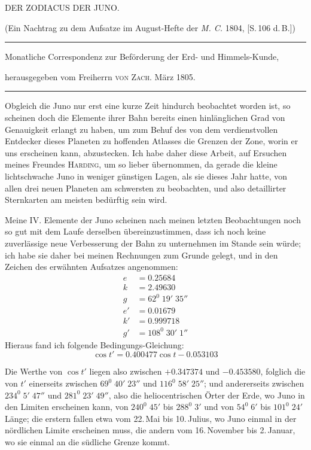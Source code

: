 \clearpage{}%
\begin{center}
{\small DER ZODIACUS DER JUNO.\par}
\medskip
{\small (Ein Nachtrag zu dem Aufsatze im August-Hefte der \textit{M. C.} 1804, [S.\,106 d.\,B.])\par}
\medskip\hrule\medskip
{\small Monatliche Correspondenz zur Beförderung der Erd- und Himmels-Kunde,\par
herausgegeben vom Freiherrn \textsc{von Zach}. März 1805.\par}
\medskip\hrule
\end{center}\medskip
Obgleich die Juno nur erst eine kurze Zeit hindurch beobachtet worden ist,
so scheinen doch die Elemente ihrer Bahn bereits einen hinlänglichen Grad
von Genauigkeit erlangt zu haben, um zum Behuf des von dem verdienstvollen
Entdecker dieses Planeten zu hoffenden Atlasses die Grenzen der Zone, worin er
uns erscheinen kann, abzustecken. Ich habe daher diese Arbeit, auf Ersuchen
meines Freundes \textsc{Harding}, um so lieber übernommen, da gerade die kleine
lichtschwache Juno in weniger günstigen Lagen, als sie dieses Jahr hatte, von
allen drei neuen Planeten am schwersten zu beobachten, und also detaillirter
Sternkarten am meisten bedürftig sein wird.

Meine IV. Elemente der Juno scheinen nach meinen letzten Beobachtungen
noch so gut mit dem Laufe derselben übereinzustimmen, dass ich noch keine
zuverlässige neue Verbesserung der Bahn zu unternehmen im Stande sein würde;
ich habe sie daher bei meinen Rechnungen zum Grunde gelegt, und in den
Zeichen des erwähnten Aufsatzes angenommen:
\[
\begin{aligned}
e&=0.25684\\
k&=2.49630\\
g&=62^0\;19'\;35''\\
e'&=0.01679\\
k'&=0.999718\\
g'&=108^0\;30'\;1''
\end{aligned}
\]
%
Hieraus fand ich folgende Bedingungs-Gleichung:
\[
\cos t'=0.400477\cos t-0.053103
\]

Die Werthe von $\cos t'$ liegen also zwischen $+0.347374$ und $-0.453580$,
folglich die von $t'$ einerseits zwischen $69^0\;40'\;23''$ und $116^0\;58'\;25''$; und
andererseits zwischen $234^0\;5'\;47''$ und $281^0\;23'\;49''$, also die heliocentrischen Örter
der Erde, wo Juno in den Limiten erscheinen kann, von $240^0\;45'$ bis $288^0\;3'$
und von $54^0\;6'$ bis $101^0\;24'$ Länge; die erstern fallen etwa vom 22.\,Mai bis 10.\,Julius,
wo Juno einmal in der nördlichen Limite erscheinen muss, die andern
vom 16.\,November bis 2.\,Januar, wo sie einmal an die südliche Grenze kommt.

